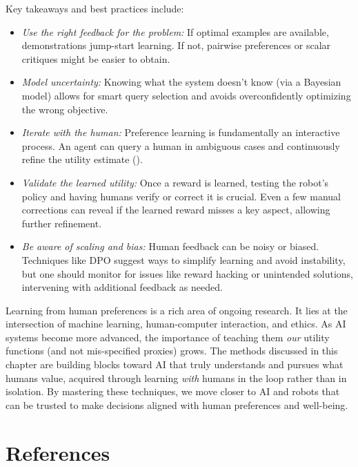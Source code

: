 \documentclass[
  letterpaper,
  numbers=noenddot,
  DIV=11]{scrreprt}
\providecommand{\tightlist}{%
  \setlength{\itemsep}{0pt}\setlength{\parskip}{0pt}}\usepackage{longtable,booktabs,array}
\theoremstyle{plain}
\theoremstyle{definition}
\theoremstyle{remark}
\begin{document}
Key takeaways and best practices include:

\begin{itemize}
\tightlist
\item
  \emph{Use the right feedback for the problem:} If optimal examples are
  available, demonstrations jump-start learning. If not, pairwise
  preferences or scalar critiques might be easier to obtain.
\item
  \emph{Model uncertainty:} Knowing what the system doesn't know (via a
  Bayesian model) allows for smart query selection and avoids
  overconfidently optimizing the wrong objective.
\item
  \emph{Iterate with the human:} Preference learning is fundamentally an
  interactive process. An agent can query a human in ambiguous cases and
  continuously refine the utility estimate
  ().
\item
  \emph{Validate the learned utility:} Once a reward is learned, testing
  the robot's policy and having humans verify or correct it is crucial.
  Even a few manual corrections can reveal if the learned reward misses
  a key aspect, allowing further refinement.
\item
  \emph{Be aware of scaling and bias:} Human feedback can be noisy or
  biased. Techniques like DPO suggest ways to simplify learning and
  avoid instability, but one should monitor for issues like reward
  hacking or unintended solutions, intervening with additional feedback
  as needed.
\end{itemize}

Learning from human preferences is a rich area of ongoing research. It
lies at the intersection of machine learning, human-computer
interaction, and ethics. As AI systems become more advanced, the
importance of teaching them \emph{our} utility functions (and not
mis-specified proxies) grows. The methods discussed in this chapter are
building blocks toward AI that truly understands and pursues what humans
value, acquired through learning \emph{with} humans in the loop rather
than in isolation. By mastering these techniques, we move closer to AI
and robots that can be trusted to make decisions aligned with human
preferences and well-being.

\section*{References}\label{bibliography-2}
\end{document}
